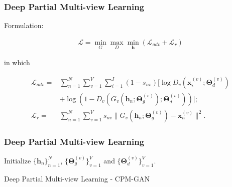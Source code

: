 \documentclass[notheorems, aspectratio=54]{beamer}
\begin{document}
\begin{frame} \frametitle{Deep Partial Multi-view Learning}



Formulation:

\begin{equation}
\begin{split}
  \mathcal{L} = \min_G\max_D\min_{\mathbf{h}} (\mathcal{L}_{adv} + \mathcal{L}_r)
\end{split}
\end{equation}

in which 

\begin{equation}
\begin{split}
  \mathcal{L}_{adv} = & \sum_{n=1}^N\sum_{v=1}^V\sum_{i=1}^I(1-s_{nv})[\log D_v(\mathbf{x}_i^{(v)};\boldsymbol{\Theta}_d^{(v)})  \\
  & + \log(1-D_v(G_v(\mathbf{h}_n;\boldsymbol{\Theta}_g^{(v)});\boldsymbol{\Theta}_d^{(v)}))]; \\
  \mathcal{L}_{r} = & \sum_{n=1}^N\sum_{v=1}^Vs_{nv}\|G_v(\mathbf{h}_n;\boldsymbol{\Theta}_g^{(v)}) - \mathbf{x}_n^{(v)} \|^2.
\end{split}
\end{equation}


\end{frame}


\begin{frame} \frametitle{Deep Partial Multi-view Learning}

\begin{algorithm}[H]
\small
        Initialize $\{\mathbf{h}_n\}_{n=1}^N$, $\{\boldsymbol{\Theta}_g^{(v)}\}_{v=1}^V$ and $\{\boldsymbol{\Theta}_d^{(v)}\}_{v=1}^V$. \\
\caption{Deep Partial Multi-view Learning - CPM-GAN}
\label{alg:cpm_gan}
\end{algorithm}


\end{frame}
\end{document}

